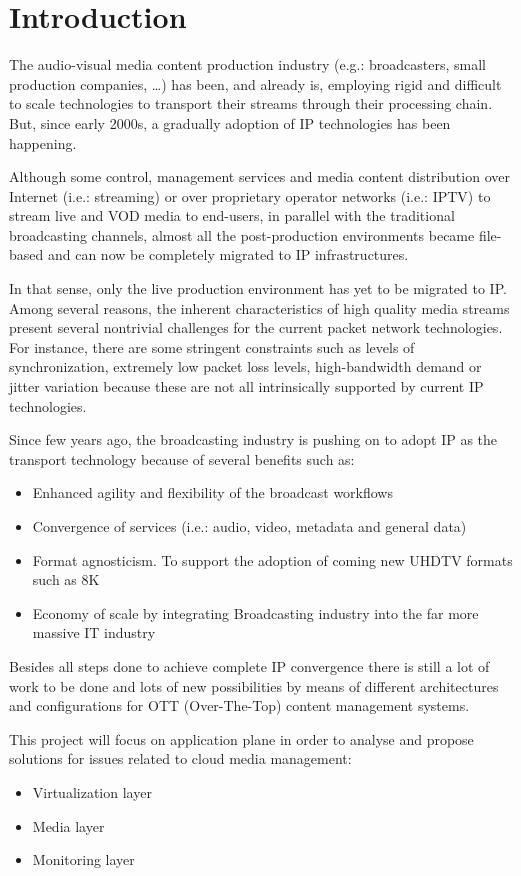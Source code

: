 \cleardoublepage
{}
\chapter*{Introduction}

The audio-visual media content production industry (e.g.: broadcasters, small production companies, \ldots) has been, and already is, employing rigid and difficult to scale technologies to transport their streams through their processing chain. But, since early 2000s, a gradually adoption of IP technologies has been happening.

Although some control, management services and media content distribution over Internet (i.e.: streaming) or over proprietary operator networks (i.e.: IPTV) to stream live and VOD media to end-users, in parallel with the traditional broadcasting channels, almost all the post-production environments became file-based and can now be completely migrated to IP infrastructures. 

In that sense, only the live production environment has yet to be migrated to IP. Among several reasons, the inherent characteristics of high quality media streams present several nontrivial challenges for the current packet network technologies. For instance, there are some stringent constraints such as levels of synchronization, extremely low packet loss levels, high-bandwidth demand or jitter variation because these are not all intrinsically supported by current IP technologies.

Since few years ago, the broadcasting industry is pushing on to adopt IP as the transport technology because of several benefits such as:

\begin{itemize}
  \item Enhanced agility and flexibility of the broadcast workflows
  \item Convergence of services (i.e.: audio, video, metadata and general data)
  \item Format agnosticism. To support the adoption of coming new UHDTV formats such as 8K 
  \item Economy of scale by integrating Broadcasting industry into the far more massive IT industry
\end{itemize}

Besides all steps done to achieve complete IP convergence there is still a lot of work to be done and lots of new possibilities by means of different architectures and configurations for OTT (Over-The-Top) content management systems. 

This project will focus on application plane in order to analyse and propose solutions for issues related to cloud media management:

 \begin{itemize}
  \item Virtualization layer
  \item Media layer 
  \item Monitoring layer
\end{itemize}






